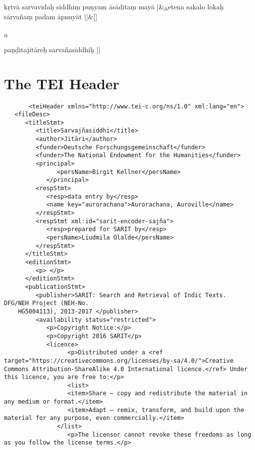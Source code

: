 \documentclass[article,12pt,a4paper]{memoir}%
\begin{document}
	    \stanza[\smallbreak]
	  kṛtvā sarvavidaḥ siddhiṃ puṇyam āsāditaṃ mayā |&{\tiny $_{lb}$}etena sakalo lokaḥ sārvañaṃ padam āpnuyāt ||\&[\smallbreak]
	  
	  
	  {\tiny $_{lb}$}
		
		\pstart
		\begin{center}
	      paṇḍitajitāreḥ sarvañasiddhiḥ ||
		\end{center}
		\pend
		
	      
	    
	    \endnumbering%
	    
     \backmatter 
	 \chapter{The TEI Header}
	 \begin{verbatim}
       <teiHeader xmlns="http://www.tei-c.org/ns/1.0" xml:lang="en">
   <fileDesc>
      <titleStmt>
         <title>Sarvajñasiddhi</title>
         <author>Jitāri</author>
         <funder>Deutsche Forschungsgemeinschaft</funder>
         <funder>The National Endowment for the Humanities</funder>
         <principal>
	           <persName>Birgit Kellner</persName>
	        </principal>
         <respStmt>
            <resp>data entry by</resp>
            <name key="aurorachana">Aurorachana, Auroville</name>
         </respStmt>
         <respStmt xml:id="sarit-encoder-sajña">
            <resp>prepared for SARIT by</resp>
            <persName>Liudmila Olalde</persName>
         </respStmt>
      </titleStmt>
      <editionStmt>
         <p> </p>
      </editionStmt>
      <publicationStmt>
         <publisher>SARIT: Search and Retrieval of Indic Texts. DFG/NEH Project (NEH-No.
	HG5004113), 2013-2017 </publisher>
         <availability status="restricted">
            <p>Copyright Notice:</p>
            <p>Copyright 2016 SARIT</p>
            <licence> 
	              <p>Distributed under a <ref target="https://creativecommons.org/licenses/by-sa/4.0/">Creative Commons Attribution-ShareAlike 4.0 International licence.</ref> Under this licence, you are free to:</p>
	              <list>
                  <item>Share — copy and redistribute the material in any medium or format.</item>
                  <item>Adapt — remix, transform, and build upon the material for any purpose, even commercially.</item>
               </list>
	              <p>The licensor cannot revoke these freedoms as long as you follow the license terms.</p>

\end{verbatim}
\end{document}
